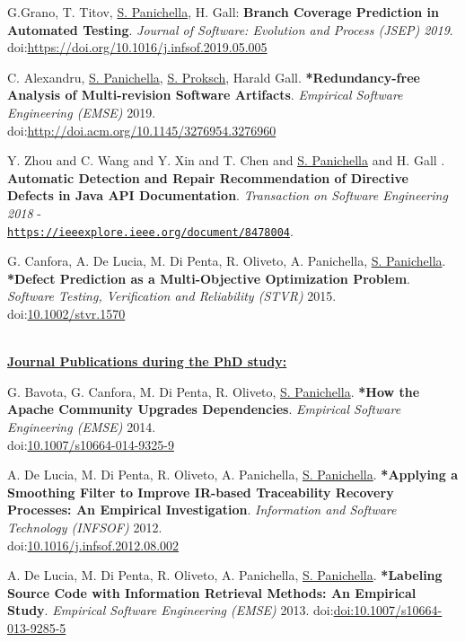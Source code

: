 \documentclass[10pt]{article}
\newcommand\doilink[1]{\href{http://dx.doi.org/#1}{#1}}
\newcommand\doi[1]{doi:\doilink{#1}}
\providecommand*\url[1]{\href{#1}{#1}}
\renewcommand*\url[1]{\href{#1}{\texttt{#1}}}
\begin{document}
\begin{bibenum}
\item \label{J02} G.Grano, T. Titov, \underline{S. Panichella}, H. Gall: \textbf{Branch Coverage Prediction in Automated Testing}.  \emph{Journal of Software: Evolution and Process (JSEP) 2019}. \\ \doi{https://doi.org/10.1016/j.infsof.2019.05.005}\\

\item \label{J0} C. Alexandru,  \underline{S. Panichella}, \underline{S. Proksch}, Harald Gall. \textbf{*Redundancy-free Analysis of Multi-revision Software Artifacts}. \emph{Empirical Software Engineering (EMSE)} 2019.\\
    \doi{http://doi.acm.org/10.1145/3276954.3276960}\\
      \item \label{J01}  Y. Zhou and 
   C. Wang and Y. Xin and T. Chen and \underline{S. Panichella} and H. Gall . \textbf{Automatic Detection and Repair Recommendation of Directive Defects in Java API Documentation}.  \emph{Transaction on Software Engineering 2018} - \\\url{https://ieeexplore.ieee.org/document/8478004}.

\item \label{J1} G. Canfora, A. De Lucia, M. Di Penta, R. Oliveto, A. Panichella, \underline{S. Panichella}. \textbf{*Defect Prediction as a Multi-Objective Optimization Problem}. \emph{Software Testing, Verification and Reliability (STVR)} 2015.\\
    \doi{10.1002/stvr.1570}\\
  \end{bibenum}
  
  \textbf{\\\underline{Journal Publications during the PhD study:}}\\
  \begin{bibenum}
    \item \label{J2} G. Bavota, G. Canfora, M. Di Penta, R. Oliveto, \underline{S. Panichella}. \textbf{*How the Apache Community Upgrades Dependencies}. \emph{Empirical Software Engineering (EMSE)} 2014.\\
             \doi{10.1007/s10664-014-9325-9}
             
    \item \label{J3}  A. De Lucia, M. Di Penta, R. Oliveto, A. Panichella, \underline{S. Panichella}. \textbf{*Applying a Smoothing Filter to Improve IR-based Traceability Recovery Processes: An Empirical Investigation}. \emph{Information and Software Technology (INFSOF)} 2012.\\
        \doi{10.1016/j.infsof.2012.08.002}

    \item \label{J5} A. De Lucia, M. Di Penta, R. Oliveto, A. Panichella, \underline{S. Panichella}. \textbf{*Labeling Source Code with Information Retrieval Methods: An Empirical Study}. \emph{Empirical Software Engineering (EMSE)} 2013.
                \doi{doi:10.1007/s10664-013-9285-5}
\end{bibenum} 
\end{document}
